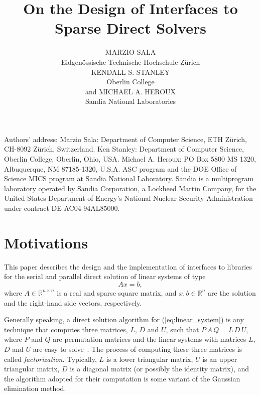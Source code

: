 \documentclass[acmtoms,acmnow]{acmtrans2m}
\title{On the Design of Interfaces to Sparse Direct Solvers}
\author{MARZIO SALA \\
Eidgen\"ossische Technische Hochschule Z\"urich \\
KENDALL S. STANLEY \\
Oberlin College \\
 and MICHAEL A. HEROUX \\
 Sandia National Laboratories}
\begin{document}
\setcounter{page}{1}

\begin{bottomstuff}
Authors' address:
\newline Marzio Sala: Department of Computer Science, ETH Z\"urich, CH-8092 Z\"urich,
  Switzerland.
\newline Ken Stanley: Department of Computer Science, Oberlin College, Oberlin, Ohio,
  USA.
\newline Michael A. Heroux: PO Box 5800 MS 1320, Albuquerque, NM 87185-1320,
U.S.A.
\newline ASC program and the DOE Office of Science MICS
program at Sandia National Laboratory.  Sandia is a multiprogram
laboratory operated by Sandia Corporation, a Lockheed Martin
Company, for the United States Department of Energy's National
Nuclear Security Administration under contract DE-AC04-94AL85000.
\end{bottomstuff}

\maketitle

\section{Motivations}
\label{sec:introduction}

This paper describes the design and the implementation of
interfaces to libraries for the serial and parallel direct solution of
linear systems of type
\begin{equation}
  \label{eq:linear_system}
  A x = b,
\end{equation}
where $A \in \mathbb{R}^{n \times n}$ is a real and sparse square matrix,
  and $x, b \in \mathbb{R}^{n}$ are the solution and
the right-hand side vectors, respectively.

Generally speaking,
a direct solution algorithm for (\ref{eq:linear_system}) is any
technique that computes three matrices, $L$, $D$ and $U$, such that
$P\, A\, Q = L \, D \, U$, where $P$ and $Q$ are permutation matrices
and the linear systems with matrices $L$, $D$ and $U$ are
easy to solve~\cite{golub96matrix}.
The process of computing these three matrices is called {\sl
  factorization}. Typically, $L$ is a lower triangular matrix, $U$ is an
upper triangular matrix, $D$ is a diagonal matrix
(or possibly the identity matrix), and the algorithm adopted for their
computation is some variant of the Gaussian elimination method.
\end{document}
